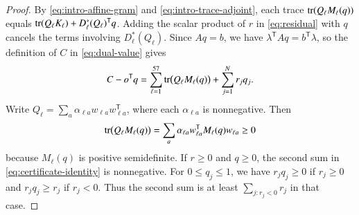 \begin{proof}
By \eqref{eq:intro-affine-gram} and
\eqref{eq:intro-trace-adjoint}, each trace
$\operatorname{tr}(Q_\ell M_\ell(q))$ equals
$\operatorname{tr}(Q_\ell K_\ell)+D_\ell^*(Q_\ell)^{\mathsf T}q$.
Adding the scalar product of $r$ in \eqref{eq:residual} with $q$
cancels the terms involving $D_\ell^*(Q_\ell)$. Since $Aq=b$,
we have $\lambda^{\mathsf T}Aq=b^{\mathsf T}\lambda$, so
the definition of $C$ in \eqref{eq:dual-value} gives
\begin{equation}\label{eq:certificate-identity}
 C-o^{\mathsf T}q
 =\sum_{\ell=1}^{57}\operatorname{tr}\bigl(Q_\ell M_\ell(q)\bigr)
  +\sum_{j=1}^N r_jq_j.
\end{equation}
Write $Q_\ell=\sum_a\alpha_{\ell a}w_{\ell a}w_{\ell a}^{\mathsf T}$,
where each $\alpha_{\ell a}$ is nonnegative. Then
\[
 \operatorname{tr}\bigl(Q_\ell M_\ell(q)\bigr)=
 \sum_a\alpha_{\ell a}w_{\ell a}^{\mathsf T}M_\ell(q)w_{\ell a}\geq0
\]
because $M_\ell(q)$ is positive semidefinite. If $r\geq0$ and $q\geq0$,
the second sum in \eqref{eq:certificate-identity} is nonnegative.
For $0\leq q_j\leq1$, we have $r_jq_j\geq0$ if $r_j\geq0$ and
$r_jq_j\geq r_j$ if $r_j<0$. Thus the second sum is at least
$\sum_{j:r_j<0}r_j$ in that case.
\end{proof}
